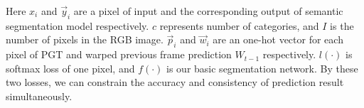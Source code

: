 Here ${x_i}$ and ${\vec y_i}$ are a pixel of input and the corresponding output of semantic segmentation model respectively. 
%
${c}$ represents number of categories, and ${I}$ is the number of pixels in the RGB image. 
%
${\vec p_i}$ and ${\vec w_i}$ are an one-hot vector for each pixel of PGT and warped previous frame prediction $W_{t-1}$ respectively. 
%
${l(\cdot)}$ is softmax loss of one pixel, and ${f(\cdot)}$ is our basic segmentation network. 
%
By these two losses, we can constrain the accuracy and consistency of prediction result simultaneously.
